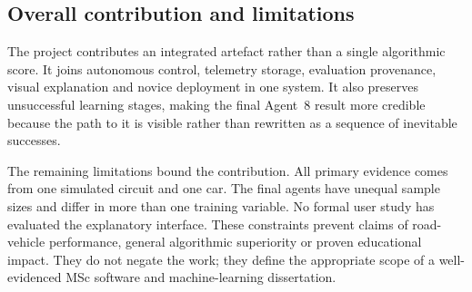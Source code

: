 \subsection{Overall contribution and limitations}

The project contributes an integrated artefact rather than a single algorithmic score. It joins autonomous control, telemetry storage, evaluation provenance, visual explanation and novice deployment in one system. It also preserves unsuccessful learning stages, making the final Agent~8 result more credible because the path to it is visible rather than rewritten as a sequence of inevitable successes.

The remaining limitations bound the contribution. All primary evidence comes from one simulated circuit and one car. The final agents have unequal sample sizes and differ in more than one training variable. No formal user study has evaluated the explanatory interface. These constraints prevent claims of road-vehicle performance, general algorithmic superiority or proven educational impact. They do not negate the work; they define the appropriate scope of a well-evidenced MSc software and machine-learning dissertation.

